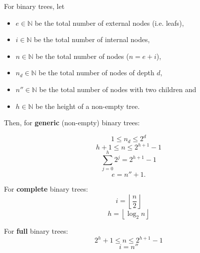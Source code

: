 \documentclass[a4paper, 10pt]{article}
\begin{document}
\begin{minipage}{0.3\linewidth}
For binary trees, let
\begin{itemize}

\item $e \in \mathbb{N}$ be the total number of external nodes (i.e. leafs),

\item $i \in \mathbb{N}$ be the total number of internal nodes,

\item $n \in \mathbb{N}$ be the total number of nodes ($n = e + i$),

\item $n_d \in \mathbb{N}$ be the total number of nodes of depth $d$,

\item $n'' \in \mathbb{N}$ be the total number of nodes with two children and

\item $h \in \mathbb{N}$ be the height of a non-empty tree.

\end{itemize}
Then, for \textbf{generic} (non-empty) binary trees:

\begin{equation}
  1 \le n_d \le 2^d
\end{equation}
\begin{equation}
  h + 1 \le n \le 2^{h+1} - 1
\end{equation}
\begin{equation}
  \sum_{j=0}^{h}2^j = 2^{h+1} - 1
\end{equation}
\begin{equation} e = n'' + 1.  \end{equation}

For \textbf{complete} binary trees:
\begin{equation}
  i = \left \lfloor{\frac{n}{2}}\right \rfloor
\end{equation}
\begin{equation}
  h = \left \lfloor{\log_2 n}\right \rfloor
\end{equation}

For \textbf{full} binary trees:
\begin{equation}
  2^h + 1 \le n \le 2^{h+1} - 1
\end{equation}
\begin{equation}
  i = n''
\end{equation}

\end{minipage}
\end{document}

